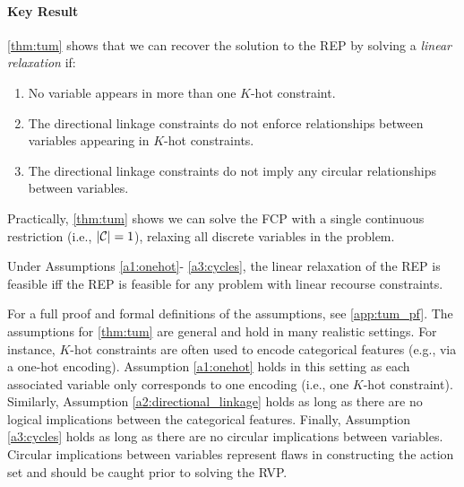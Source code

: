 %
\paragraph{Key Result} 

\cref{thm:tum} shows that we can recover the solution to the REP by solving a \emph{linear relaxation} if:
%
\begin{enumerate}[label={A.\arabic*}, itemsep=0pt]
\item 
No variable appears in more than one $K$-hot constraint.\label{a1:onehot} 
\item The directional linkage constraints do not enforce relationships between variables appearing in $K$-hot constraints.\label{a2:directional_linkage}
\item The directional linkage constraints do not imply any circular relationships between variables. \label{a3:cycles}
\end{enumerate}
%
Practically, \cref{thm:tum} shows we can solve the FCP with a single continuous restriction (i.e., $|{\cal C}| = 1$),
relaxing all discrete variables in the problem.
%
\begin{theorem}\label{thm:tum}
Under Assumptions \ref{a1:onehot}- \ref{a3:cycles}, the linear relaxation of the REP is feasible iff the REP is feasible for any problem with linear recourse constraints.
\end{theorem}
%
For a full proof and formal definitions of the assumptions, see \cref{app:tum_pf}. The assumptions for \cref{thm:tum} are general and hold in many realistic settings. For instance, $K$-hot constraints are often used to encode categorical features (e.g., via a one-hot encoding). Assumption \ref{a1:onehot} holds in this setting as each associated variable only corresponds to one encoding (i.e., one $K$-hot constraint). Similarly, Assumption \ref{a2:directional_linkage} holds as long as there are no logical implications between the categorical features. Finally, Assumption \ref{a3:cycles} holds as long as there are no circular implications between variables. Circular implications between variables represent flaws in constructing the action set and should be caught prior to solving the RVP.

